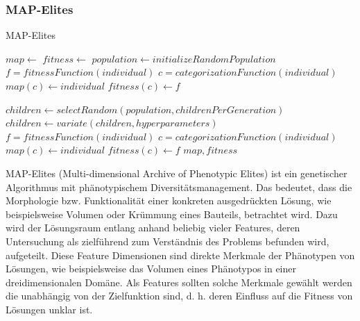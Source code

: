 \subsubsection{MAP-Elites}

\label{sub:mapElites}
\begin{algorithm}
	\caption{MAP-Elites} \label{alg:mapElites}
	\begin{algorithmic}[1]
		\State $map \gets $ 
		\State $fitness \gets $ 
		\State $population \gets initializeRandomPopulation$ 
			\State $f = fitnessFunction(individual)$
			\State $c = categorizationFunction(individual)$ 
			 
				\State $map(c) \gets individual$
				\State $fitness(c) \gets f$
			\EndIf
		\EndFor
		
			\State $children \gets selectRandom(population,childrenPerGeneration)$ 
			\State $children \gets variate(children,hyperparameters)$ 
				\State $f = fitnessFunction(individual)$
				\State $c = categorizationFunction(individual)$
					\State $map(c) \gets individual$
					\State $fitness(c) \gets f$
				\EndIf
			\EndFor
		\EndFor
		\Return $map,fitness$
		\EndProcedure
	\end{algorithmic}
\end{algorithm}
MAP-Elites (Multi-dimensional Archive of Phenotypic Elites)\cite{Mouret.4202015} ist ein genetischer Algorithmus mit phänotypischem Diversitätsmanagement.
Das bedeutet, dass die Morphologie bzw. Funktionalität einer konkreten ausgedrückten Lösung, wie beispielsweise Volumen oder Krümmung eines Bauteils, betrachtet wird.
Dazu wird der Lösungsraum entlang anhand beliebig vieler Features, deren Untersuchung als zielführend zum Verständnis des Problems befunden wird, aufgeteilt.
Diese Feature Dimensionen sind direkte Merkmale der Phänotypen von Lösungen, wie beispielsweise das Volumen eines Phänotypos in einer dreidimensionalen Domäne.
Als Features sollten solche Merkmale gewählt werden die unabhängig von der Zielfunktion sind, d. h. deren Einfluss auf die Fitness von Lösungen unklar ist.
